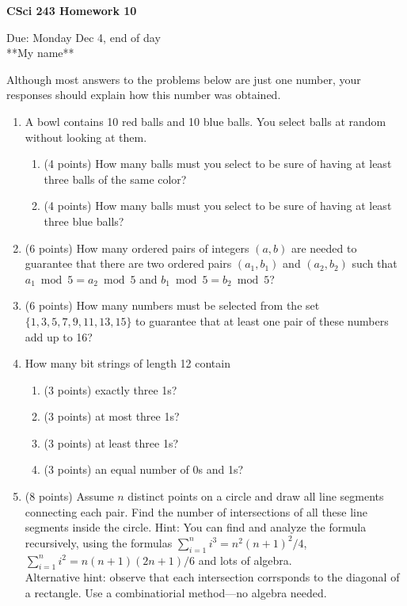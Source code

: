 \documentclass[11pt]{article}
\begin{document}
\begin{center}             %
\begin{LARGE}
{\bf CSci 243 Homework 10}
\end{LARGE}
\vskip 0.25cm      %

Due: Monday Dec 4, end of day\\  %
**My name**
\end{center}             %

Although most answers to the problems below are just one number,
 your responses should explain how this number was obtained.

\begin{enumerate}

\item A bowl contains 10 red balls and 10 blue balls.
You select balls at random without looking at them.
\begin{enumerate}
\item (4 points) How many balls must you select to be sure of having at least three balls of the same color?
\item (4 points) How many balls must you select to be sure of having at least three blue balls?
\end{enumerate}


\item (6 points) How many ordered pairs of integers $(a,b)$ are needed to guarantee that
there are two ordered pairs $(a_1,b_1)$ and $(a_2,b_2)$ such that $a_1\bmod 5=a_2\bmod 5$ and
$b_1\bmod 5=b_2\bmod 5$?

\item (6 points) How many numbers must be selected from the set $\{1,3,5,7,9,11,13,15\}$ to guarantee that at least one pair of these numbers add up to 16?


\item How many bit strings of length 12 contain
\begin{enumerate}
\item (3 points) exactly three 1s?
\item (3 points) at most three 1s?
\item (3 points) at least three 1s?
\item (3 points) an equal number of 0s and 1s?
\end{enumerate}

\item (8 points)
Assume $n$ distinct points on a circle and draw all line segments connecting each pair.
Find the number of intersections of all these line segments inside the circle.
Hint: You can find and analyze the formula recursively, using the formulas
$\sum_{i=1}^n i^3 = n^2(n+1)^2/4$, $\sum_{i=1}^n i^2 = n(n+1)(2n+1)/6$ and lots of algebra.\\
Alternative hint: observe that each intersection corrsponds to the diagonal of a rectangle. Use a combinatiorial method---no algebra needed.

\end{enumerate}
\end{document}
